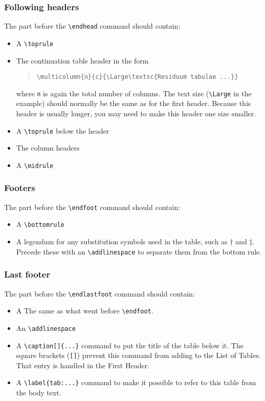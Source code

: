 \documentclass{report}
\begin{document}
\subsubsection{Following headers}
The part before the \verb+\endhead+ command should contain:
\begin{itemize}
\item A \verb+\toprule+
\item The continuation table header in the form
\begin{quote}
\verb+\multicolumn{n}{c}{\Large\textsc{Residuum tabulae ...}}+
\end{quote}
where \verb+n+ is again the total number of columns.
The text size
(\verb+\Large+ in the example) should normally be the same as for the first
header.
Because this header is usually longer, you may need to make this header one
size smaller.
\item A \verb+\toprule+ below the header
\item The column headers
\item A \verb+\midrule+
\end{itemize}

\subsubsection{Footers}
The part before the \verb+\endfoot+ command should contain:
\begin{itemize}
\item A \verb+\bottomrule+
\item A legendum for any substitution symbols used in the table,
such as \super† and \super‡.
Precede these with an \verb+\addlinespace+ to separate them from the bottom
rule.
\end{itemize}

\subsubsection{Last footer}
The part before the \verb+\endlastfoot+ command should contain:
\begin{itemize}
\item A The same as what went before \verb+\endfoot+.
\item An \verb+\addlinespace+
\item A \verb+\caption[]{...}+ command to put the title of the table below it.
The square brackets (\verb+[]+) prevent this command from adding to the List
of Tables. That entry is handled in the First Header.
\item A \verb+\label{tab:...}+ command to make it possible to refer to this
table from the body text.
\end{itemize}
\end{document}
